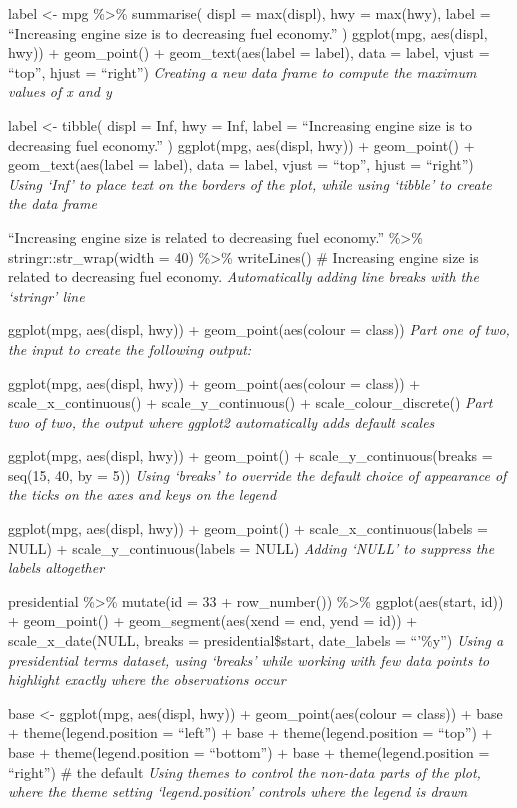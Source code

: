 \documentclass[
]{article}
\begin{document}
label \textless- mpg \%\textgreater\% summarise( displ = max(displ), hwy
= max(hwy), label = ``Increasing engine size is \nrelated to decreasing
fuel economy.'' ) ggplot(mpg, aes(displ, hwy)) + geom\_point() +
geom\_text(aes(label = label), data = label, vjust = ``top'', hjust =
``right'') \emph{Creating a new data frame to compute the maximum values
of x and y}

label \textless- tibble( displ = Inf, hwy = Inf, label = ``Increasing
engine size is \nrelated to decreasing fuel economy.'' ) ggplot(mpg,
aes(displ, hwy)) + geom\_point() + geom\_text(aes(label = label), data =
label, vjust = ``top'', hjust = ``right'') \emph{Using `Inf' to place
text on the borders of the plot, while using `tibble' to create the data
frame}

``Increasing engine size is related to decreasing fuel economy.''
\%\textgreater\% stringr::str\_wrap(width = 40) \%\textgreater\%
writeLines() \# Increasing engine size is related to decreasing fuel
economy. \emph{Automatically adding line breaks with the `stringr' line}

ggplot(mpg, aes(displ, hwy)) + geom\_point(aes(colour = class))
\emph{Part one of two, the input to create the following output:}

ggplot(mpg, aes(displ, hwy)) + geom\_point(aes(colour = class)) +
scale\_x\_continuous() + scale\_y\_continuous() +
scale\_colour\_discrete() \emph{Part two of two, the output where
ggplot2 automatically adds default scales}

ggplot(mpg, aes(displ, hwy)) + geom\_point() +
scale\_y\_continuous(breaks = seq(15, 40, by = 5)) \emph{Using `breaks'
to override the default choice of appearance of the ticks on the axes
and keys on the legend}

ggplot(mpg, aes(displ, hwy)) + geom\_point() +
scale\_x\_continuous(labels = NULL) + scale\_y\_continuous(labels =
NULL) \emph{Adding `NULL' to suppress the labels altogether}

presidential \%\textgreater\% mutate(id = 33 + row\_number())
\%\textgreater\% ggplot(aes(start, id)) + geom\_point() +
geom\_segment(aes(xend = end, yend = id)) + scale\_x\_date(NULL, breaks
= presidential\$start, date\_labels = ``'\%y'') \emph{Using a
presidential terms dataset, using `breaks' while working with few data
points to highlight exactly where the observations occur}

base \textless- ggplot(mpg, aes(displ, hwy)) + geom\_point(aes(colour =
class)) + base + theme(legend.position = ``left'') + base +
theme(legend.position = ``top'') + base + theme(legend.position =
``bottom'') + base + theme(legend.position = ``right'') \# the default
\emph{Using themes to control the non-data parts of the plot, where the
theme setting `legend.position' controls where the legend is drawn}
\end{document}
